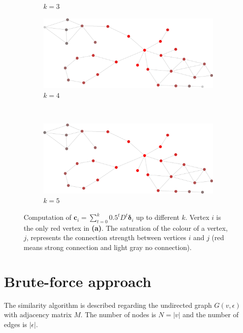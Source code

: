 \documentclass[12pt]{report}
\begin{document}
\begin{figure}[tpb]
\begin{subfigure}[b]{0.5\textwidth}
    \caption{$k=3$}
  \end{subfigure}
  \begin{subfigure}[b]{0.5\textwidth}
    \includegraphics[width=\textwidth]{frame4}
		\caption{$k=4$}
  \end{subfigure}%
  ~
  \begin{subfigure}[b]{0.5\textwidth}
    \includegraphics[width=\textwidth]{frame5}
    \caption{$k=5$}
  \end{subfigure}


  \caption{Computation of $\bm{c}_i = \sum_{t=0}^k 0.5^t D^t \bm{\delta}_i$ up
  to different $k$. Vertex $i$ is the only red vertex in \textbf{(a)}. The
  saturation of the colour of a vertex, $j$, represents the connection strength
  between vertices $i$ and $j$ (red means strong connection and light gray no
  connection).}
  \label{fig:ci_diffusion}
\end{figure}

%
%
\section{Brute-force approach}
%
The similarity algorithm is described regarding the undirected graph $G(v, \epsilon)$
with adjacency matrix $M$. The number of nodes is $N = |v|$ and the number of
edges is $|\epsilon|$.
\end{document}
